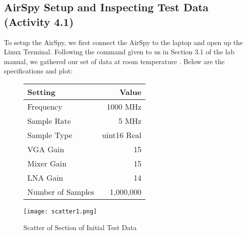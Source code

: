 \documentclass[10pt, preprint]{aastex}
\begin{document}
\begin{table}[H]
\caption{\label{table:Observations}Group D Data Collection Layout}
\end{table}

\subsection{AirSpy Setup and Inspecting Test Data (Activity 4.1)}

To setup the AirSpy, we first connect the AirSpy to the laptop and open up the Linux Terminal. Following the command given to us in Section 3.1 of the lab manual, we gathered our set of data at room temperature \cite{labmanual}. Below are the specifications and plot:

\begin{figure}[H]
\centering
\begin{minipage}{0.45\textwidth} %
    \centering
    \begin{tabular}{lr}
        \hline
        Setting & Value \\
        \hline
        Frequency & 1000 MHz \\
        Sample Rate & 5 MHz \\
        Sample Type & uint16 Real \\
        VGA Gain & 15 \\
        Mixer Gain & 15 \\
        LNA Gain & 14 \\
        Number of Samples & 1,000,000 \\
    \end{tabular}
\end{minipage}%
\hspace{0.05\textwidth} %
\begin{minipage}{0.45\textwidth} %
    \centering
    \texttt{[image: scatter1.png]}
    \caption{\label{fig:Scatter1} Scatter of Section of Initial Test Data}
\end{minipage}
\end{figure}
\end{document}
